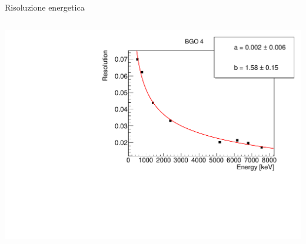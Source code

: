 \documentclass [xcolor=svgnames, 9pt] {beamer}
\begin{document}
\begin{frame}{Risoluzione energetica}
\begin{columns}
\begin{column}{0.5\textwidth}
				\includegraphics[width=\textwidth]{img/ResGraph_4.pdf}
		\end{column}
	\end{columns}
\end{frame}
\end{document}
